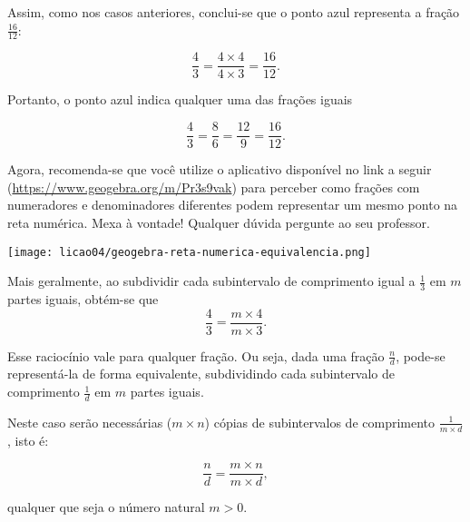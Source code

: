 \begin{refletindo*}
\begin{center}
\end{center}

Assim, como nos casos anteriores, conclui-se que o ponto azul representa a fração $\frac{16}{12}$:

$$\dfrac{4}{3} = \dfrac{4 \times 4}{4 \times 3} = \dfrac{16}{12}.$$

Portanto, o ponto azul indica qualquer uma das frações iguais

$$\dfrac{4}{3} = \dfrac{8}{6} = \dfrac{12}{9} = \dfrac{16}{12}.$$

Agora, recomenda-se que você utilize o aplicativo disponível no link a seguir (\url{https://www.geogebra.org/m/Pr3s9vak}) para perceber como frações com numeradores e denominadores diferentes podem representar um mesmo ponto  na reta numérica. Mexa à vontade! Qualquer dúvida pergunte ao seu professor.
\begin{center}
\texttt{[image: licao04/geogebra-reta-numerica-equivalencia.png]}
\end{center}

Mais geralmente, ao subdividir cada subintervalo de comprimento igual a $\frac{1}{3}$ em $m$ partes iguais, obtém-se que
$$\dfrac{4}{3} = \dfrac{m \times 4}{m \times 3}.$$

Esse raciocínio vale para qualquer fração. Ou seja, dada uma fração $\frac{n}{d}$, pode-se representá-la de forma equivalente, subdividindo cada subintervalo de comprimento $\frac{1}{d}$ em $m$ partes iguais.

Neste caso serão necessárias ($m \times n$) cópias de subintervalos de comprimento $\frac{1}{m \times d}$, isto é:

$$\dfrac{n}{d} = \dfrac{m \times n}{m \times d},$$

qualquer que seja o número natural $m > 0$.

\end{refletindo*}

